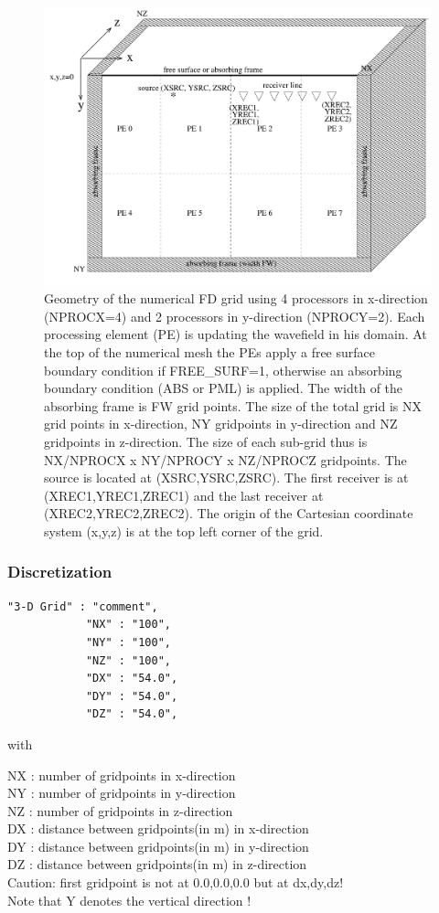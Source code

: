 \documentclass[11pt,onecolumn,oneside]{article}
\begin{document}
\begin{figure}
\begin{center}
\includegraphics[width=\textwidth,angle=0]{eps/grid.pdf}
\end{center}
\caption{Geometry of the numerical FD grid using 4 processors in x-direction (NPROCX=4) and 2 processors in y-direction (NPROCY=2). Each processing element (PE) is updating the wavefield in his domain.
At the top of the numerical mesh the PEs apply a free surface boundary condition if FREE\_SURF=1, otherwise an absorbing boundary condition (ABS or PML) is applied. The width of the absorbing frame is FW grid points.  The size of the total grid is NX grid points in x-direction, NY gridpoints in y-direction and NZ gridpoints in z-direction. The size of each sub-grid  thus is NX/NPROCX x NY/NPROCY x NZ/NPROCZ gridpoints. The source is located at (XSRC,YSRC,ZSRC). The first receiver is at (XREC1,YREC1,ZREC1) and the  last receiver at (XREC2,YREC2,ZREC2). The origin of the Cartesian coordinate system (x,y,z) is at the top left corner of the grid. }
\label{fig_grid}
\end{figure}
\subsubsection{Discretization}
\begin{verbatim}
"3-D Grid" : "comment",
			"NX" : "100",
			"NY" : "100",
			"NZ" : "100",
			"DX" : "54.0",
			"DY" : "54.0",
			"DZ" : "54.0",
\end{verbatim}

with

NX : number of gridpoints in x-direction\\
NY : number of gridpoints in y-direction\\
NZ : number of gridpoints in z-direction\\
DX : distance between gridpoints(in m) in x-direction\\
DY : distance between gridpoints(in m) in y-direction\\
DZ : distance between gridpoints(in m) in z-direction\\
Caution: first gridpoint is not at {0.0,0.0,0.0} but at {dx,dy,dz}!\\
Note that Y denotes the vertical direction !\\
\end{document}
